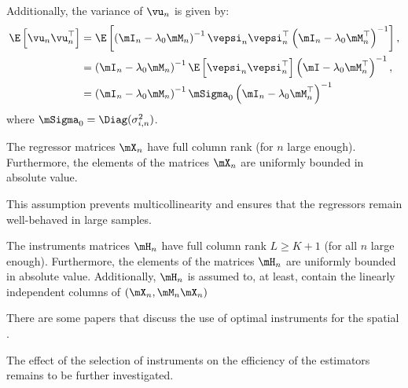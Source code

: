 \documentclass[english,12pt]{book}\usepackage[]{graphicx}\usepackage[]{xcolor}
\begin{document}
Additionally, the variance of $\vu_n$ is given by:
\begin{equation*}
\begin{aligned}
	\E\left[\vu_n\vu^\top_n\right] & = \E\left[\left(\mI_n - \lambda_0 \mM_n\right)^{-1}\vepsi_n\vepsi^\top_n\left(\mI_n - \lambda_0 \mM^\top_n\right)^{-1}\right], \\
	& = \left(\mI_n - \lambda_0\mM_n\right)^{-1}\E\left[\vepsi_n\vepsi^\top_n\right]\left(\mI - \lambda_0 \mM^\top_n\right)^{-1}, \\
	& = \left(\mI_n - \lambda_0 \mM_n\right)^{-1}\mSigma_0\left(\mI_n - \lambda_0\mM^\top_n\right)^{-1}
\end{aligned}
\end{equation*}
%
where $\mSigma_0 = \Diag(\sigma^2_{i,n})$.

\begin{assumption}\label{assump:no_multi_gmmhet}
The regressor matrices $\mX_n$ have full column rank (for $n$ large enough). Furthermore, the elements of the matrices $\mX_n$ are uniformly bounded in absolute value.
\end{assumption}

This assumption prevents multicollinearity and ensures that the regressors remain well-behaved in large samples.

\begin{assumption} The instruments matrices $\mH_n$ have full column rank $L \geq K + 1$ (for all $n$ large enough). Furthermore, the elements of the matrices $\mH_n$ are uniformly bounded in absolute value. Additionally, $\mH_n$ is assumed to, at least, contain the linearly independent columns of $(\mX_n, \mM_n\mX_n)$
\end{assumption}

There are some papers that discuss the use of optimal instruments for the spatial \citep[see for example][]{lee2003best, das2003finite, Keliejian2004, lee2007gmm}.

\begin{remark}
The effect of the selection of instruments on the efficiency of the estimators remains to be further investigated.
\end{remark}
\end{document}
